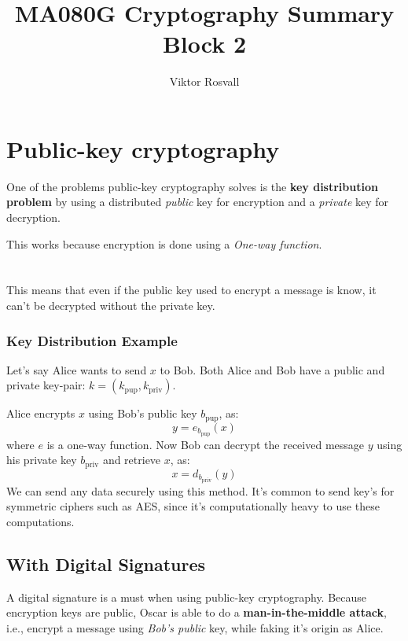 \documentclass{article}
\title{MA080G Cryptography Summary Block 2}
\author{Viktor Rosvall}
\begin{document}
	\maketitle
	
	\section*{Public-key cryptography}
	One of the problems public-key cryptography solves is the \textbf{key distribution problem} by using a distributed \textit{public} key for encryption and a \textit{private} key for decryption.
	
	This works because encryption is done using a \textit{One-way function}.
	\\
	\\
	\\ 
	This means that even if the public key used to encrypt a message is know, it can't be decrypted without the private key. \cite{pubkeysummary}
	
	\subsubsection*{Key Distribution Example \cite{pubkeysummary}}
	Let's say Alice wants to send $x$ to Bob. Both Alice and Bob have a public and private key-pair: $k = (k_{\text{pup}},k_{\text{priv}})$. 
	
	Alice encrypts $x$ using Bob's public key $b_{\text{pup}}$, as:
	$$
	y = e_{b_{\text{pup}}}(x)
	$$ 
	where $e$ is a one-way function. Now Bob can decrypt the received message $y$  using his private key $b_{\text{priv}}$ and retrieve $x$, as:
	$$
	x = d_{b_{\text{priv}}}(y)
	$$
	We can send any data securely using this method. It's common to send key's for symmetric ciphers such as AES, since it's computationally heavy to use these computations. 
	
	\subsection*{With Digital Signatures \cite{digitalsignature}}
	A digital signature is a must when using public-key cryptography. Because encryption keys are public, Oscar is able to do a \textbf{man-in-the-middle attack}, i.e., encrypt a message using \textit{Bob's public }key, while faking it's origin as Alice.
	
\end{document}
